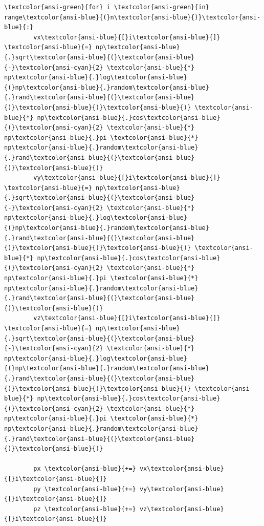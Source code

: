 \documentclass[11pt]{article}
\begin{document}
\begin{Verbatim}[commandchars=\\\{\}]
    \textcolor{ansi-green}{for} i \textcolor{ansi-green}{in} range\textcolor{ansi-blue}{(}n\textcolor{ansi-blue}{)}\textcolor{ansi-blue}{:}
        vx\textcolor{ansi-blue}{[}i\textcolor{ansi-blue}{]} \textcolor{ansi-blue}{=} np\textcolor{ansi-blue}{.}sqrt\textcolor{ansi-blue}{(}\textcolor{ansi-blue}{-}\textcolor{ansi-cyan}{2} \textcolor{ansi-blue}{*} np\textcolor{ansi-blue}{.}log\textcolor{ansi-blue}{(}np\textcolor{ansi-blue}{.}random\textcolor{ansi-blue}{.}rand\textcolor{ansi-blue}{(}\textcolor{ansi-blue}{)}\textcolor{ansi-blue}{)}\textcolor{ansi-blue}{)} \textcolor{ansi-blue}{*} np\textcolor{ansi-blue}{.}cos\textcolor{ansi-blue}{(}\textcolor{ansi-cyan}{2} \textcolor{ansi-blue}{*} np\textcolor{ansi-blue}{.}pi \textcolor{ansi-blue}{*} np\textcolor{ansi-blue}{.}random\textcolor{ansi-blue}{.}rand\textcolor{ansi-blue}{(}\textcolor{ansi-blue}{)}\textcolor{ansi-blue}{)}
        vy\textcolor{ansi-blue}{[}i\textcolor{ansi-blue}{]} \textcolor{ansi-blue}{=} np\textcolor{ansi-blue}{.}sqrt\textcolor{ansi-blue}{(}\textcolor{ansi-blue}{-}\textcolor{ansi-cyan}{2} \textcolor{ansi-blue}{*} np\textcolor{ansi-blue}{.}log\textcolor{ansi-blue}{(}np\textcolor{ansi-blue}{.}random\textcolor{ansi-blue}{.}rand\textcolor{ansi-blue}{(}\textcolor{ansi-blue}{)}\textcolor{ansi-blue}{)}\textcolor{ansi-blue}{)} \textcolor{ansi-blue}{*} np\textcolor{ansi-blue}{.}cos\textcolor{ansi-blue}{(}\textcolor{ansi-cyan}{2} \textcolor{ansi-blue}{*} np\textcolor{ansi-blue}{.}pi \textcolor{ansi-blue}{*} np\textcolor{ansi-blue}{.}random\textcolor{ansi-blue}{.}rand\textcolor{ansi-blue}{(}\textcolor{ansi-blue}{)}\textcolor{ansi-blue}{)}
        vz\textcolor{ansi-blue}{[}i\textcolor{ansi-blue}{]} \textcolor{ansi-blue}{=} np\textcolor{ansi-blue}{.}sqrt\textcolor{ansi-blue}{(}\textcolor{ansi-blue}{-}\textcolor{ansi-cyan}{2} \textcolor{ansi-blue}{*} np\textcolor{ansi-blue}{.}log\textcolor{ansi-blue}{(}np\textcolor{ansi-blue}{.}random\textcolor{ansi-blue}{.}rand\textcolor{ansi-blue}{(}\textcolor{ansi-blue}{)}\textcolor{ansi-blue}{)}\textcolor{ansi-blue}{)} \textcolor{ansi-blue}{*} np\textcolor{ansi-blue}{.}cos\textcolor{ansi-blue}{(}\textcolor{ansi-cyan}{2} \textcolor{ansi-blue}{*} np\textcolor{ansi-blue}{.}pi \textcolor{ansi-blue}{*} np\textcolor{ansi-blue}{.}random\textcolor{ansi-blue}{.}rand\textcolor{ansi-blue}{(}\textcolor{ansi-blue}{)}\textcolor{ansi-blue}{)}
        
        px \textcolor{ansi-blue}{+=} vx\textcolor{ansi-blue}{[}i\textcolor{ansi-blue}{]}
        py \textcolor{ansi-blue}{+=} vy\textcolor{ansi-blue}{[}i\textcolor{ansi-blue}{]}
        pz \textcolor{ansi-blue}{+=} vz\textcolor{ansi-blue}{[}i\textcolor{ansi-blue}{]}


\end{Verbatim}
\end{document}
